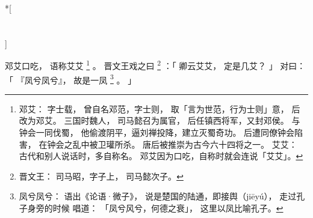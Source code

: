 
\switchcolumn[0]*[\section{}]

邓艾口吃，
语称艾艾%
\footnote{%
    邓艾：
        字士载，
        曾自名邓范，字士则，
        取「言为世范，行为士则」意，
        后改为邓艾。
        三国时魏人，
        司马懿召为属官，
        后任镇西将军，又封邓侯。
        与钟会一同伐蜀，
        他偷渡阴平，逼刘禅投降，建立灭蜀奇功。
        后遭同僚钟会陷害，
        在钟会之乱中被卫瓘所杀。
        唐后被推崇为古今六十四将之一。
    艾艾：
        古代和别人说话时，多自称名。
        邓艾因为口吃，自称时就会连说「艾艾」。
}%
。
晋文王戏之曰%
\footnote{%
    晋文王：
        司马昭，字子上，
        司马懿次子。
}%
：「
    卿云艾艾，
    定是几艾？
」
对曰：「
    『凤兮凤兮』，
    故是一凤%
    \footnote{%
        凤兮凤兮：
            语出《论语·微子》，
            说是楚国的陆通，即接舆（jiēyú），
            走过孔子身旁的时候
            唱道：
            「凤兮风兮，何德之衰」，
            这里以凤比喻孔子。
    }%
    。
」

\switchcolumn



